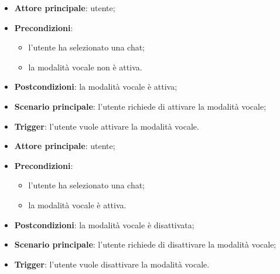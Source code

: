 \documentclass[10pt, a4paper]{article}
\begin{document}
    \begin{itemize}
        \item \textbf{Attore principale}: utente;
        \item \textbf{Precondizioni}: 
            \begin{itemize}
                \item l’utente ha selezionato una chat;
                \item la modalità vocale non è attiva.
            \end{itemize}
        \item \textbf{Postcondizioni}: la modalità vocale è attiva;
        \item \textbf{Scenario principale}: l’utente richiede di attivare la modalità vocale;
        \item \textbf{Trigger}: l’utente vuole attivare la modalità vocale.
    \end{itemize}
    
    \begin{itemize}
        \item \textbf{Attore principale}: utente;
        \item \textbf{Precondizioni}: 
            \begin{itemize}
                \item l’utente ha selezionato una chat;
                \item la modalità vocale è attiva.
            \end{itemize}
        \item \textbf{Postcondizioni}: la modalità vocale è disattivata;
        \item \textbf{Scenario principale}: l’utente richiede di disattivare la modalità vocale;
        \item \textbf{Trigger}: l’utente vuole disattivare la modalità vocale.
    \end{itemize}
    
\end{document}
